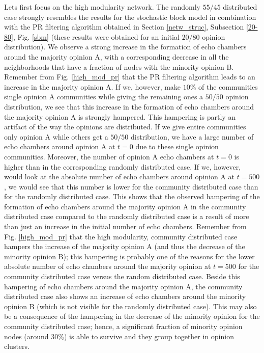 \documentclass[11 pt , letterpaper , twoside , openright]{book}
\begin{document}
Lets first focus on the high modularity network. The randomly $55/45$ distributed case strongly resembles the results for the stochastic block model in combination with the PR filtering algorithm obtained in Section \ref{netw_struc}, Subsection \ref{20-80}, Fig. \ref{sbm} (these results were obtained for an initial $20/80$ opinion distribution). We observe a strong increase in the formation of echo chambers around the majority opinion A, with a corresponding decrease in all the neighborhoods that have a fraction of nodes with the minority opinion B. Remember from Fig. \ref{high_mod_pr} that the PR filtering algorithm leads to an increase in the majority opinion A. If we, however, make $10 \%$ of the communities single opinion A communities while giving the remaining ones a $50/50$ opinion distribution, we see that this increase in the formation of echo chambers around the majority opinion A is strongly hampered. This hampering is partly an artifact of the way the opinions are distributed. If we give entire communities only opinion A while others get a $50/50$ distribution, we have a large number of echo chambers around opinion A at $t=0$ due to these single opinion communities. Moreover, the number of opinion A echo chambers at $t=0$ is higher than in the corresponding randomly distributed case. If we, however, would look at the absolute number of echo chambers around opinion A at $t=500$, we would see that this number is lower for the community distributed case than for the randomly distributed case. This shows that the observed hampering of the formation of echo chambers around the majority opinion A in the community distributed case compared to the randomly distributed case is a result of more than just an increase in the initial number of echo chambers. Remember from Fig. \ref{high_mod_pr} that the high modularity, community distributed case hampers the increase of the majority opinion A (and thus the decrease of the minority opinion B); this hampering is probably one of the reasons for the lower absolute number of echo chambers around the majority opinion at $t=500$ for the community distributed case versus the random distributed case. Beside this hampering of echo chambers around the majority opinion A, the community distributed case also shows an increase of echo chambers around the minority opinion B (which is not visible for the randomly distributed case). This may also be a consequence of the hampering in the decrease of the minority opinion for the community distributed case; hence, a significant fraction of minority opinion nodes (around $30 \%$) is able to survive and they group together in opinion clusters.  %
\end{document}
